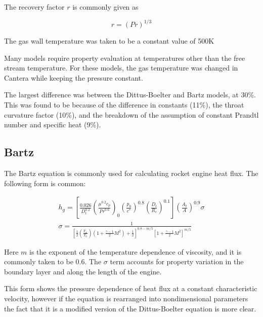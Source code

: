 \documentclass[11pt]{article}
\begin{document}
The recovery factor $r$ is commonly given as

\begin{equation}
    r = (Pr)^{1/3}
\end{equation}

The gas wall temperature was taken to be a constant value of 500K %

Many models require property evaluation at temperatures other than the free stream temperature. For these models, the gas temperature was changed in Cantera while keeping the pressure constant.


The largest difference was between the Dittus-Boelter and Bartz models, at 30\%. This was found to be because of the difference in constants (11\%), the throat curvature factor (10\%), and the breakdown of the assumption of constant Prandtl number and specific heat (9\%).

\subsection{Bartz}


The Bartz equation is commonly used for calculating rocket engine heat flux. The following form is common:

\begin{equation}
    \label{equation:bartz}
    \begin{split}
         h_g = \left[ \frac{0.026}{D_t^{0.2}} \left( \frac{\mu^{0.2} c_p}{{Pr}^{0.6}} \right)_{0} \left( \frac{p_0}{c^*} \right)^{0.8} \left( \frac{D_t}{R_c} \right)^{0.1} \right] \left( \frac{A_t}{A} \right)^{0.9} \sigma \\
         \sigma = \frac{1}{\left[ \frac{1}{2} \left( \frac{T_{w}}{T_0} \right) \left( 1 + \frac{\gamma - 1}{2} M^2 \right) + \frac{1}{2}\right]^{0.8-m/5} \left[ 1 + \frac{\gamma - 1}{2} M^2 \right]^{m/5}}
    \end{split}
\end{equation}

Here $m$ is the exponent of the temperature dependence of viscosity, and it is commonly taken to be 0.6. The $\sigma$ term accounts for property variation in the boundary layer and along the length of the engine.

This form shows the pressure dependence of heat flux at a constant characteristic velocity, however if the equation is rearranged into nondimensional parameters the fact that it is a modified version of the Dittus-Boelter equation is more clear.
\end{document}
